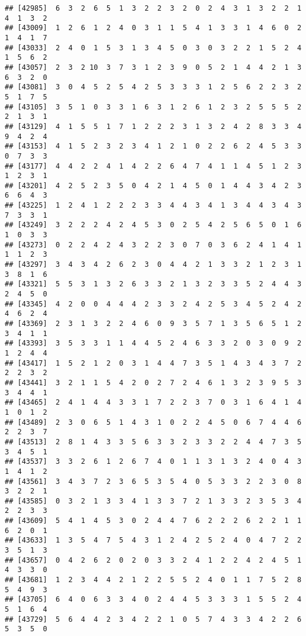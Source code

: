 \documentclass[
]{article}
\begin{document}
\begin{verbatim}
## [42985]  6  3  2  6  5  1  3  2  2  3  2  0  2  4  3  1  3  2  2  1  4  1  3  2
## [43009]  1  2  6  1  2  4  0  3  1  1  5  4  1  3  3  1  4  6  0  2  1  4  1  7
## [43033]  2  4  0  1  5  3  1  3  4  5  0  3  0  3  2  2  1  5  2  4  1  5  6  2
## [43057]  2  3  2 10  3  7  3  1  2  3  9  0  5  2  1  4  4  2  1  3  6  3  2  0
## [43081]  3  0  4  5  2  5  4  2  5  3  3  3  1  2  5  6  2  2  3  2  5  1  7  5
## [43105]  3  5  1  0  3  3  1  6  3  1  2  6  1  2  3  2  5  5  5  2  2  1  3  1
## [43129]  4  1  5  5  1  7  1  2  2  2  3  1  3  2  4  2  8  3  3  4  9  4  2  4
## [43153]  4  1  5  2  3  2  3  4  1  2  1  0  2  2  6  2  4  5  3  3  0  7  3  3
## [43177]  4  4  2  2  4  1  4  2  2  6  4  7  4  1  1  4  5  1  2  3  1  2  3  1
## [43201]  4  2  5  2  3  5  0  4  2  1  4  5  0  1  4  4  3  4  2  3  6  6  4  3
## [43225]  1  2  4  1  2  2  2  3  3  4  4  3  4  1  3  4  4  3  4  3  7  3  3  1
## [43249]  3  2  2  2  4  2  4  5  3  0  2  5  4  2  5  6  5  0  1  6  1  0  3  3
## [43273]  0  2  2  4  2  4  3  2  2  3  0  7  0  3  6  2  4  1  4  1  1  1  2  3
## [43297]  3  4  3  4  2  6  2  3  0  4  4  2  1  3  3  2  1  2  3  1  3  8  1  6
## [43321]  5  5  3  1  3  2  6  3  3  2  1  3  2  3  3  5  2  4  4  3  2  4  5  0
## [43345]  4  2  0  0  4  4  4  2  3  3  2  4  2  5  3  4  5  2  4  2  4  6  2  4
## [43369]  2  3  1  3  2  2  4  6  0  9  3  5  7  1  3  5  6  5  1  2  3  4  1  1
## [43393]  3  5  3  3  1  1  4  4  5  2  4  6  3  3  2  0  3  0  9  2  1  2  4  4
## [43417]  1  5  2  1  2  0  3  1  4  4  7  3  5  1  4  3  4  3  7  2  2  2  3  2
## [43441]  3  2  1  1  5  4  2  0  2  7  2  4  6  1  3  2  3  9  5  3  3  4  4  1
## [43465]  2  4  1  4  4  3  3  1  7  2  2  3  7  0  3  1  6  4  1  4  1  0  1  2
## [43489]  2  3  0  6  5  1  4  3  1  0  2  2  4  5  0  6  7  4  4  6  2  2  3  7
## [43513]  2  8  1  4  3  3  5  6  3  3  2  3  3  2  2  4  4  7  3  5  3  4  5  1
## [43537]  3  3  2  6  1  2  6  7  4  0  1  1  3  1  3  2  4  0  4  3  1  4  1  2
## [43561]  3  4  3  7  2  3  6  5  3  5  4  0  5  3  3  2  2  3  0  8  3  2  2  1
## [43585]  0  3  2  1  3  3  4  1  3  3  7  2  1  3  3  2  3  5  3  4  2  2  3  3
## [43609]  5  4  1  4  5  3  0  2  4  4  7  6  2  2  2  6  2  2  1  1  6  2  0  1
## [43633]  1  3  5  4  7  5  4  3  1  2  4  2  5  2  4  0  4  7  2  2  3  5  1  3
## [43657]  0  4  2  6  2  0  2  0  3  3  2  4  1  2  2  4  2  4  5  1  4  3  3  0
## [43681]  1  2  3  4  4  2  1  2  2  5  5  2  4  0  1  1  7  5  2  8  5  4  9  3
## [43705]  6  4  0  6  3  3  4  0  2  4  4  5  3  3  3  1  5  5  2  4  5  1  6  4
## [43729]  5  6  4  4  2  3  4  2  2  1  0  5  7  4  3  3  4  2  2  6  5  3  5  0

\end{verbatim}
\end{document}
